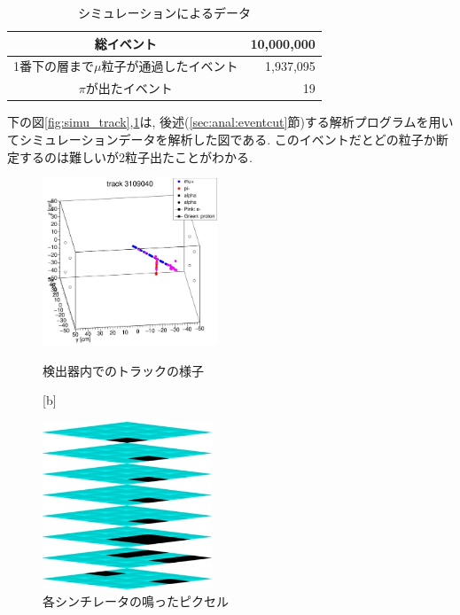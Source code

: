 \begin{table}[H]
    \centering
    \caption{シミュレーションによるデータ}
    \label{tab:simu_data}
    \begin{tabular}{|c|r|}
        \hline
        総イベント                               & 10,000,000 \\ \hline
        1番下の層まで$\mu$粒子が通過したイベント & 1,937,095  \\ \hline
        $\pi$が出たイベント                      & 19         \\ \hline
    \end{tabular}
\end{table}

下の図\ref{fig:simu_track},\ref{fig:simu_pixel}は, 後述(\ref{sec:anal:eventcut}節)する解析プログラムを用いてシミュレーションデータを解析した図である.
このイベントだとどの粒子か断定するのは難しいが2粒子出たことがわかる.
\begin{figure}[H]
    \begin{minipage}[b]{0.47\linewidth}
        \centering
        \includegraphics[height=5cm]{img/track_pion.jpg}
        \caption{検出器内でのトラックの様子}
        \label{fig:simu_track}
    \end{minipage}[b]
    \begin{minipage}[b]{0.47\linewidth}
        \centering
        \includegraphics[height=5cm]{img/track_simulation.jpg}
        \caption{各シンチレータの鳴ったピクセル}
        \label{fig:simu_pixel}
    \end{minipage}
\end{figure}

